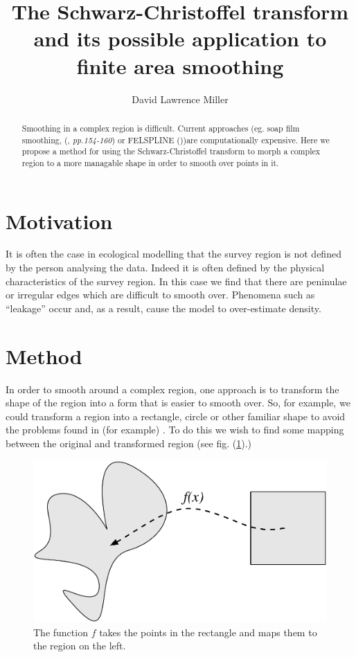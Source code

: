 \documentclass[a4paper,10pt]{amsart}
\title{The Schwarz-Christoffel transform and its possible application to finite area smoothing}
\author{David Lawrence Miller}
\newcommand{\sch}{Schwarz-Christoffel }
\begin{document}
 
\begin{abstract}
Smoothing in a complex region is difficult. Current approaches (eg. soap film smoothing, (\cite{soap}, \emph{pp.154-160}) or FELSPLINE (\cite{ramsay}))are computationally expensive. Here we propose a method for using the \sch transform to morph a complex region to a more managable shape in order to smooth over points in it.
\end{abstract}
 
 
\newtheorem{thm}{Theorem}[section]
 
\newtheorem{defn}{Definition}[section]
 
\maketitle



\section{Motivation}

It is often the case in ecological modelling that the survey region is not defined by the person analysing the data. Indeed it is often defined by the physical characteristics of the survey region. In this case we find that there are peninulae or irregular edges which are difficult to smooth over. Phenomena such as ``leakage'' occur and, as a result, cause the model to over-estimate density.

\section{Method}

In order to smooth around a complex region, one approach is to transform the shape of the region into a form that is easier to smooth over. So, for example, we could transform a region into a rectangle, circle or other familiar shape to avoid the problems found in (for example) \cite{ramsay}. To do this we wish to find some mapping between the original and transformed region (see fig. (\ref{simpledia}).)

\begin{figure} [htbp]
\centering
\includegraphics[scale=0.3]{figs/simpledia.pdf}
\caption{The function $f$ takes the points in the rectangle and maps them to the region on the left.}
\label{simpledia}
\end{figure}
\end{document}
